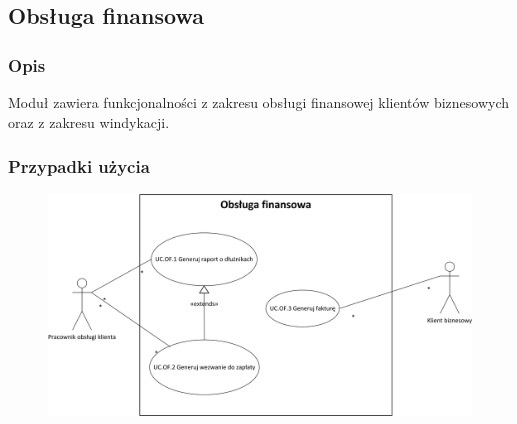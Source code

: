 \subsection{Obsługa finansowa}
\subsubsection*{Opis}
Moduł zawiera funkcjonalności z zakresu obsługi finansowej klientów biznesowych oraz z zakresu windykacji.

\subsubsection*{Przypadki użycia}
\begin{figure}[H]
\centering
\includegraphics[width=\textwidth]{img/obs_fin_uc}
\end{figure}

